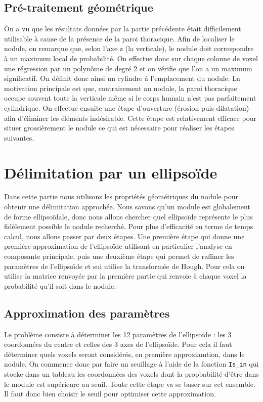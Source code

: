\documentclass{article}
\begin{document}
\subsection{Pré-traitement géométrique}

On a vu que les résultats données par la partie précédente était difficilement utilisable à cause de la présence de la paroi thoracique. Afin de localiser le nodule, on remarque que, selon l'axe z (la verticale), le nodule doit correspondre à un maximum local de probabilité. On effectue donc sur chaque colonne de voxel une régression par un polynôme de degré 2 et on vérifie que l'on a un maximum significatif. 
On définit donc ainsi un cylindre à l'emplacement du nodule. La motivation principale est que, contrairement au nodule, la paroi thoracique occupe souvent toute la verticale même si le corps humain n'est pas parfaitement cylindrique.
On effectue ensuite une étape d'ouverture (érosion puis dilatation) afin d'éliminer les éléments indésirable.
Cette étape est relativement efficace pour situer grossièrement le nodule ce qui est nécessaire pour réaliser les étapes suivantes.



\section{Délimitation par un ellipsoïde}

Dans cette partie nous utilisons les propriétés géométriques du nodule pour obtenir une délimitation approchée. Nous savons qu'un module est globalement de forme ellipsoïdale, donc nous allons chercher quel ellipsoïde représente le plus fidèlement possible le nodule recherché. Pour plus d'efficacité en terme de temps calcul, nous allons passer par deux étapes. Une première étape qui donne une première approximation de l'ellipsoïde utilisant en particulier l'analyse en composante principale, puis une deuxième étape qui permet de raffiner les paramètres de l'ellipsoïde et sui utilise la transformée de Hough. Pour cela on utilise la matrice renvoyée par la première partie qui renvoie à chaque voxel la probabilité qu'il soit dans le nodule.

\subsection{Approximation des paramètres}

Le problème consiste à déterminer les 12 paramètres de l'ellipsoïde : les 3 coordonnées du centre et celles des 3 axes de l'ellipsoïde. Pour cela il faut déterminer quels voxels seront considérés, en première approxiamtion, dans le nodule. On commence donc par faire un seuillage à  l'aide de la fonction  \texttt{Is\_in} qui stocke dans un tableau les coordonnées des voxels dont la propbabilité d'être dans le module est supérieure au seuil. Toute cette étape va se baser sur cet ensemble. Il faut donc bien choisir le seuil pour optimiser cette approximation.
\end{document}
